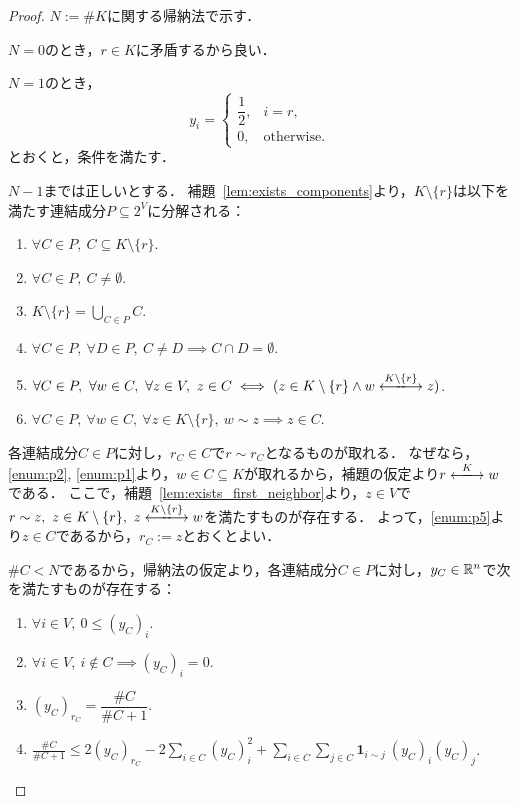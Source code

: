 \begin{proof}
  $N := \# K$に関する帰納法で示す．
  
  $N = 0$のとき，$r \in K$に矛盾するから良い．

  $N = 1$のとき，
  \begin{equation}
    y_i = \begin{cases}
      \dfrac{1}{2}, & i = r,\\
      0, & \text{otherwise}.
    \end{cases}
  \end{equation}
  とおくと，条件を満たす．

  $N - 1$までは正しいとする．
  補題~\ref{lem:exists_components}より，$K \setminus \{r\}$は以下を満たす連結成分$P \subseteq 2 ^ V$に分解される：
  \begin{enumerate}[label = (p\arabic*)]
    \item $\forall C \in P,\ C \subseteq K \setminus \{r\}$. \label{enum:p1}
    \item $\forall C \in P,\ C \ne \emptyset$. \label{enum:p2}
    \item $K \setminus \{r\} = \displaystyle \bigcup_{C \in P} C$. \label{enum:p3}
    \item $\forall C \in P,\ \forall D \in P,\ C \ne D \implies C \cap D = \emptyset$. \label{enum:p4}
    \item $\forall C \in P,\ \forall w \in C,\ \forall z \in V,\ z \in C \iff (z \in K \setminus \{r\} \land w \reach{K \setminus \{r\}} z)$. \label{enum:p5}
    \item $\forall C \in P,\ \forall w \in C,\ \forall z \in K \setminus \{r\},\ w \sim z \implies z \in C$. \label{enum:p6}
  \end{enumerate}
  
  各連結成分$C \in P$に対し，$r_C \in C$で$r \sim r_C$となるものが取れる．
  なぜなら，\ref{enum:p2}, \ref{enum:p1}より，$w \in C \subseteq K$が取れるから，補題の仮定より$r \reach{K} w$である．
  ここで，補題~\ref{lem:exists_first_neighbor}より，$z \in V$で$r \sim z,\ z \in K \setminus \{r\},\ z \reach{K \setminus \{r\}} w$を満たすものが存在する．
  よって，\ref{enum:p5}より$z \in C$であるから，$r_C := z$とおくとよい．

  $\# C < N$であるから，帰納法の仮定より，各連結成分$C \in P$に対し，$y_C \in \mathbb{R}^n$で次を満たすものが存在する：
  \begin{enumerate}[label = (i\arabic*)]
    \item $\forall i \in V,\ 0 \le (y_C)_i$. \label{enum:i1}
    \item $\forall i \in V,\ i \notin C \implies (y_C)_i = 0$. \label{enum:i2}
    \item $(y_C)_{r_C} = \dfrac{\# C}{\# C + 1}$. \label{enum:i3}
    \item $\displaystyle \frac{\# C}{\# C + 1} \le 2 (y_C)_{r_C} - 2 \sum_{i \in C} (y_C)_i ^ 2 + \sum_{i \in C} \sum_{j \in C} \bm{1}_{i \sim j}\ (y_C)_i (y_C)_j$. \label{enum:i4}
  \end{enumerate}


\end{proof}
